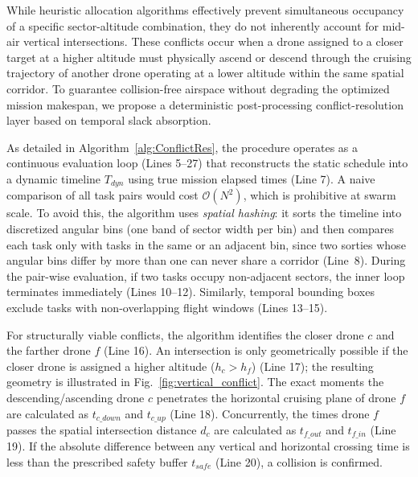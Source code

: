 \documentclass[subscriptcorrection,upint,nolists, varvw,barcolor=Goldenrod3,mathalfa=cal=euler,balance,hyphenate,french]{asmejour} %
\begin{document}
While heuristic allocation algorithms effectively prevent simultaneous occupancy of a specific sector-altitude combination, they do not inherently account for mid-air vertical intersections. These conflicts occur when a drone assigned to a closer target at a higher altitude must physically ascend or descend through the cruising trajectory of another drone operating at a lower altitude within the same spatial corridor.
To guarantee collision-free airspace without degrading the optimized mission makespan, we propose a deterministic post-processing conflict-resolution layer based on temporal slack absorption.

As detailed in Algorithm~\ref{alg:ConflictRes}, the procedure operates as a continuous evaluation loop (Lines 5--27) that reconstructs the static schedule into a dynamic timeline $T_{\mathit{dyn}}$ using true mission elapsed times (Line 7). 
A naive comparison of all task pairs would cost $\mathcal{O}(N^2)$, which is prohibitive at swarm scale. To avoid this, the algorithm uses \emph{spatial hashing}: it sorts the timeline into discretized angular bins (one band of sector width per bin) and then compares each task only with tasks in the same or an adjacent bin, since two sorties whose angular bins differ by more than one can never share a corridor (Line~8).
During the pair-wise evaluation, if two tasks occupy non-adjacent sectors, the inner loop terminates immediately (Lines 10--12). Similarly, temporal bounding boxes exclude tasks with non-overlapping flight windows (Lines 13--15).

For structurally viable conflicts, the algorithm identifies the closer drone $c$ and the farther drone $f$ (Line 16). 
An intersection is only geometrically possible if the closer drone is assigned a higher altitude ($h_c > h_f$) (Line 17); the resulting geometry is illustrated in Fig.~\ref{fig:vertical_conflict}.
The exact moments the descending/ascending drone $c$ penetrates the horizontal cruising plane of drone $f$ are calculated as $t_{c\_down}$ and $t_{c\_up}$ (Line 18). 
Concurrently, the times drone $f$ passes the spatial intersection distance $d_c$ are calculated as $t_{f\_out}$ and $t_{f\_in}$ (Line 19).
If the absolute difference between any vertical and horizontal crossing time is less than the prescribed safety buffer $t_{\mathit{safe}}$ (Line 20), a collision is confirmed.
\end{document}
